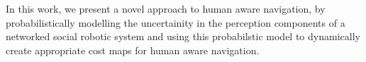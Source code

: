In this work, we present a novel approach to human aware navigation, by probabilistically modelling the uncertainity in the perception components of a  networked social robotic system and using this probabilstic model to dynamically create appropriate cost maps for human aware navigation.

